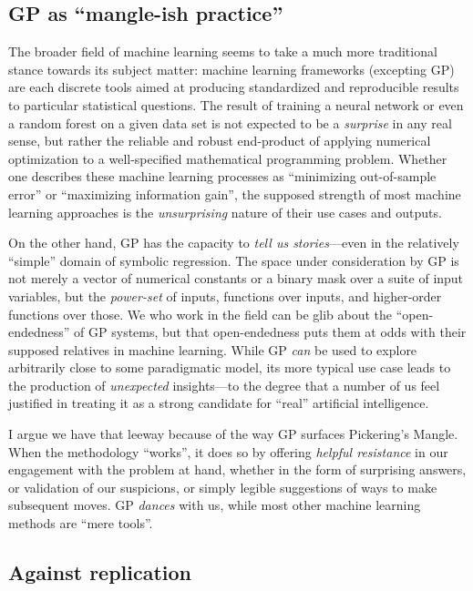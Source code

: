\subsection{GP as ``mangle-ish practice''}\hypertarget{gp-as-mangle-ish-practice}{}\label{gp-as-mangle-ish-practice}

The broader field of machine learning seems to take a much more traditional stance towards its subject matter: machine learning frameworks (excepting GP) are each discrete tools aimed at producing standardized and reproducible results to particular statistical questions. The result of training a neural network or even a random forest on a given data set is not expected to be a \emph{surprise} in any real sense, but rather the reliable and robust end-product of applying numerical optimization to a well-specified mathematical programming problem. Whether one describes these machine learning processes as ``minimizing out-of-sample error'' or ``maximizing information gain'', the supposed strength of most machine learning approaches is the \emph{unsurprising} nature of their use cases and outputs.

On the other hand, GP has the capacity to \emph{tell us stories}---even in the relatively ``simple'' domain of symbolic regression. The space under consideration by GP is not merely a vector of numerical constants or a binary mask over a suite of input variables, but the \emph{power-set} of inputs, functions over inputs, and higher-order functions over those. We who work in the field can be glib about the ``open-endedness'' of GP systems, but that open-endedness puts them at odds with their supposed relatives in machine learning. While GP \emph{can} be used to explore arbitrarily close to some paradigmatic model, its more typical use case leads to the production of \emph{unexpected} insights---to the degree that a number of us feel justified in treating it as a strong candidate for ``real'' artificial intelligence.

I argue we have that leeway because of the way GP surfaces Pickering's Mangle. When the methodology ``works'', it does so by offering \emph{helpful resistance} in our engagement with the problem at hand, whether in the form of surprising answers, or validation of our suspicions, or simply legible suggestions of ways to make subsequent moves. GP \emph{dances} with us, while most other machine learning methods are ``mere tools''.

\subsection{Against replication}\hypertarget{against-replication}{}\label{against-replication}

